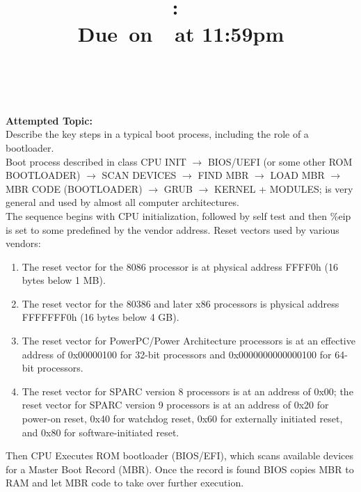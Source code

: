 \documentclass{article}
\title{
    \vspace{2in}
    \textmd{\textbf{\hmwkClass:\ \hmwkTitle}}\\
    \normalsize\vspace{0.1in}\small{Due\ on\ \hmwkDueDate\ at 11:59pm}\\
    \vspace{0.1in}\large{\textit{\hmwkClassInstructor\ \hmwkClassTime}}
    \vspace{3in}
}
\author{\textbf{\hmwkAuthorName}}
\date{}
\begin{document}
\maketitle

\pagebreak

        \textbf{Attempted Topic: }\\
        Describe the key steps in a typical boot process, including the role of a bootloader.\\

        Boot process described in class
        CPU INIT $\rightarrow$ BIOS/UEFI (or some other ROM BOOTLOADER) $\rightarrow$ SCAN 
        DEVICES $\rightarrow$ FIND MBR $\rightarrow$ LOAD MBR
        $\rightarrow$ MBR CODE (BOOTLOADER) $\rightarrow$ GRUB $\rightarrow$ KERNEL + MODULES; 
        is very general and used by almost all computer architectures.\\


        The sequence begins with CPU initialization, followed by self test and then \%eip  is 
        set to some predefined by the vendor address.
        Reset vectors used by various vendors:

        \begin{enumerate}[1.]
            \item The reset vector for the 8086 processor is at physical address FFFF0h (16 bytes 
                below 1 MB).
            \item The reset vector for the 80386 and later x86 processors is physical address
                FFFFFFF0h (16 bytes below 4 GB).
            \item The reset vector for PowerPC/Power Architecture processors is at an effective
                address of 0x00000100 for 32-bit processors and 0x0000000000000100 for 64-bit
                processors.
            \item The reset vector for SPARC version 8 processors is at an address of 0x00; the 
                reset vector for SPARC version 9 processors is at an address of 0x20 for power-on 
                reset, 0x40 for watchdog reset, 0x60 for externally initiated reset, and 0x80 for
                software-initiated reset.
        \end{enumerate}


        Then CPU Executes ROM bootloader (BIOS/EFI), which scans available devices for a Master Boot
        Record (MBR). Once the record is found BIOS copies MBR to RAM and let MBR code to take over
        further execution.
\end{document}
